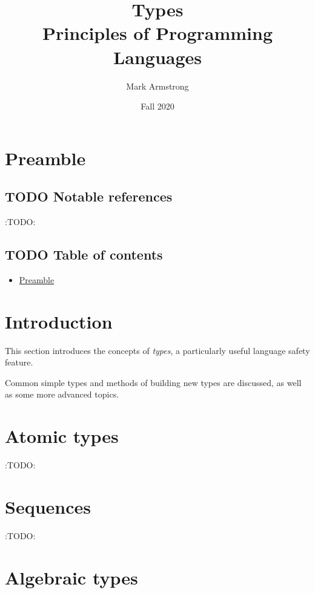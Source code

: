 \documentclass[11pt]{article}
\author{Mark Armstrong}
\date{Fall 2020}
\title{Types\\\medskip
\large Principles of Programming Languages}
\theoremstyle{definition}
\begin{document}
\maketitle

\section{Preamble}
\label{sec:orge41145d}

\subsection{{\bfseries\sffamily TODO} Notable references}
\label{sec:org39e58c2}

:TODO:

\subsection{{\bfseries\sffamily TODO} Table of contents}
\label{sec:org07cf0a1}

\begin{scriptsize}
\begin{itemize}
\item \hyperref[sec:orge41145d]{Preamble}
\end{itemize}
\end{scriptsize}

\section{Introduction}
\label{sec:org0bb2705}

This section introduces the concepts of \emph{types},
a particularly useful language safety feature.

Common simple types and methods of building new types are discussed,
as well as some more advanced topics.

\section{Atomic types}
\label{sec:org967b421}

:TODO:

\section{Sequences}
\label{sec:org43e2a5d}

:TODO:

\section{Algebraic types}
\label{sec:org5f6635b}
\end{document}
